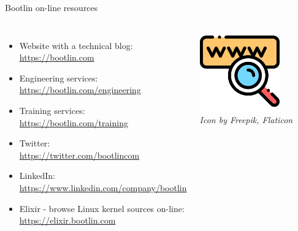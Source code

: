 \begin{frame}{Bootlin on-line resources}
  \begin{columns}
    \begin{itemize}
    \item Website with a technical blog:\\
      \url{https://bootlin.com}
    \item Engineering services:\\
      \url{https://bootlin.com/engineering}
    \item Training services:\\
      \url{https://bootlin.com/training}
    \item Twitter:\\
      \url{https://twitter.com/bootlincom}
    \item LinkedIn:\\
      \url{https://www.linkedin.com/company/bootlin}
    \item Elixir - browse Linux kernel sources on-line:\\
      \url{https://elixir.bootlin.com}
    \end{itemize}
    \begin{center}
      \includegraphics[width=0.7\textwidth]{slides/about-us/www.png}\\
      {\tiny {\em Icon by Freepik, Flaticon}}
    \end{center}
  \end{columns}
\end{frame}
